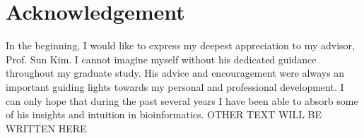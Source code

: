 \documentclass[oneside,phd]{snuthesis}
\begin{document}
\section*{Acknowledgement}
In the beginning, I would like to express my deepest appreciation to my advisor, Prof. Sun Kim.
I cannot imagine myself without his dedicated guidance throughout my graduate study.
His advice and encouragement were always an important guiding lights towards my personal and professional development.
I can only hope that during the past several years I have been able to absorb some of his insights and intuition in bioinformatics.
OTHER TEXT WILL BE WRITTEN HERE




\end{document}
